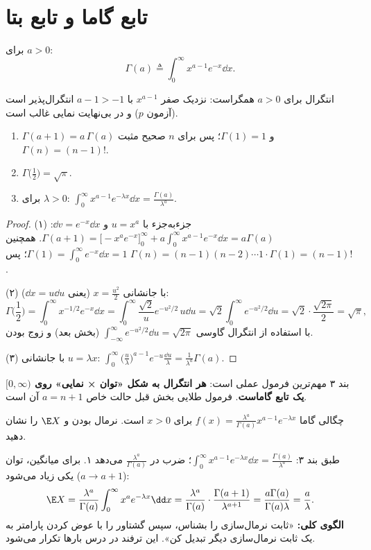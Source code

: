 \section{تابع گاما و تابع بتا}

\begin{definition}
برای $a>0$:
\[
\Gamma(a)\triangleq\int_0^\infty x^{a-1}e^{-x}\dd x .
\]
\end{definition}
انتگرال برای $a>0$ همگراست: نزدیک صفر $x^{a-1}$ با $a-1>-1$ انتگرال‌پذیر است (آزمون $p$) و در بی‌نهایت نمایی غالب است.

\begin{theorem}
\begin{enumerate}
\item $\Gamma(a+1)=a\,\Gamma(a)$ و $\Gamma(1)=1$؛ پس برای $n$ صحیح مثبت $\Gamma(n)=(n-1)!$.
\item $\Gamma\big(\frac12\big)=\sqrt\pi$.
\item برای $\lambda>0$: $\displaystyle\int_0^\infty x^{a-1}e^{-\lambda x}\dd x=\frac{\Gamma(a)}{\lambda^a}$.
\end{enumerate}
\end{theorem}
\begin{proof}
(۱) جزءبه‌جزء با $u=x^a$ و $\dd v=e^{-x}\dd x$: $\Gamma(a+1)=\big[-x^ae^{-x}\big]_0^\infty+a\int_0^\infty x^{a-1}e^{-x}\dd x=a\Gamma(a)$. همچنین $\Gamma(1)=\int_0^\infty e^{-x}\dd x=1$؛ پس $\Gamma(n)=(n-1)(n-2)\cdots1\cdot\Gamma(1)=(n-1)!$.

(۲) با جانشانی $x=\frac{u^2}{2}$ (یعنی $\dd x=u\dd u$):
\[
\Gamma\Big(\frac12\Big)=\int_0^\infty x^{-1/2}e^{-x}\dd x=\int_0^\infty\frac{\sqrt2}{u}e^{-u^2/2}\,u\dd u=\sqrt2\int_0^\infty e^{-u^2/2}\dd u=\sqrt2\cdot\frac{\sqrt{2\pi}}{2}=\sqrt\pi ,
\]
با استفاده از انتگرال گاوسی $\int_{-\infty}^\infty e^{-u^2/2}\dd u=\sqrt{2\pi}$ (بخش بعد) و زوج بودن.

(۳) با جانشانی $u=\lambda x$: $\int_0^\infty\big(\frac u\lambda\big)^{a-1}e^{-u}\frac{\dd u}{\lambda}=\frac{1}{\lambda^a}\Gamma(a)$.
\end{proof}

بند ۳ مهم‌ترین فرمول عملی است: \textbf{هر انتگرال به شکل «توان × نمایی» روی $[0,\infty)$ یک تابع گاماست}. فرمول طلایی بخش قبل حالت خاص $a=n+1$ آن است.

\begin{example}
چگالی گاما $f(x)=\frac{\lambda^a}{\Gamma(a)}x^{a-1}e^{-\lambda x}$ برای $x>0$ است. نرمال بودن و $\E X$ را نشان دهید.
\begin{solution}
طبق بند ۳: $\int_0^\infty x^{a-1}e^{-\lambda x}\dd x=\frac{\Gamma(a)}{\lambda^a}$؛ ضرب در $\frac{\lambda^a}{\Gamma(a)}$ می‌دهد ۱. برای میانگین، توان یکی زیاد می‌شود ($a\to a+1$):
\[
\E X=\frac{\lambda^a}{\Gamma(a)}\int_0^\infty x^{a}e^{-\lambda x}\dd x=\frac{\lambda^a}{\Gamma(a)}\cdot\frac{\Gamma(a+1)}{\lambda^{a+1}}=\frac{a\Gamma(a)}{\Gamma(a)\lambda}=\frac a\lambda .
\]
\textbf{الگوی کلی:} «ثابت نرمال‌سازی را بشناس، سپس گشتاور را با عوض کردن پارامتر به یک ثابت نرمال‌سازی دیگر تبدیل کن». این ترفند در درس بارها تکرار می‌شود.
\end{solution}
\end{example}

